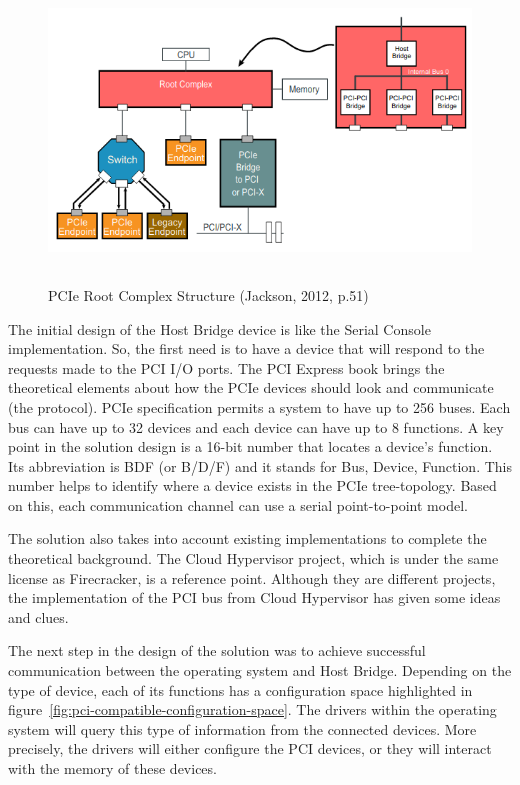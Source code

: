 \documentclass[12pt, a4paper]{report}
\begin{document}
\begin{figure}[H]
\centering
\includegraphics[height=8cm, keepaspectratio]{pics/pcie-root-complex.png}
  \caption{{PCIe Root Complex Structure (Jackson, 2012, p.51)}\cite{book_pci_express}}
  \label{fig:pcie-root-complex}
\end{figure}

The initial design of the Host Bridge device is like the Serial Console implementation. So, the first need is to have a device that will respond to the requests made to the PCI I/O ports. The PCI Express book\cite{book_pci_express} brings the theoretical elements about how the PCIe devices should look and communicate (the protocol). PCIe specification permits a system to have up to 256 buses. Each bus can have up to 32 devices and each device can have up to 8 functions. A key point in the solution design is a 16-bit number that locates a device's function. Its abbreviation is BDF (or B/D/F) and it stands for Bus, Device, Function. This number helps to identify where a device exists in the PCIe tree-topology. Based on this, each communication channel can use a serial point-to-point model.

The solution also takes into account existing implementations to complete the theoretical background. The Cloud Hypervisor project, which is under the same license as Firecracker, is a reference point. Although they are different projects, the implementation of the PCI bus from Cloud Hypervisor has given some ideas and clues.

The next step in the design of the solution was to achieve successful communication between the operating system and Host Bridge. Depending on the type of device, each of its functions has a configuration space highlighted in figure~\ref{fig:pci-compatible-configuration-space}. The drivers within the operating system will query this type of information from the connected devices. More precisely, the drivers will either configure the PCI devices, or they will interact with the memory of these devices.
\end{document}
